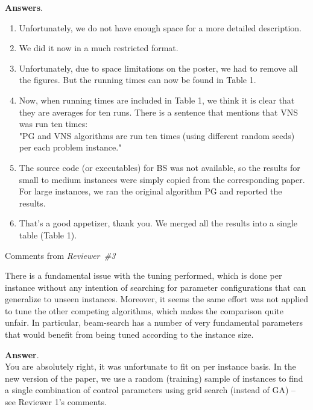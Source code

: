 \documentclass [11pt]{scrartcl}
\begin{document}
\textbf{Answers}. 
\begin{enumerate}
	
\item Unfortunately, we do not have enough space for a more detailed description.
\item We did it now in a much restricted format. 
\item Unfortunately, due to space limitations on the poster, we had to remove all the figures. But the running times can now be found in Table 1.
\item Now, when running times are included in Table 1, we think it is clear that they are averages for ten runs. There is a sentence that mentions that VNS was run ten times:\\ 
"PG and VNS algorithms are run ten times (using different random seeds) per each problem instance."
\item The source code (or executables) for BS was not available, so the results for small to medium instances were simply copied from the corresponding paper. For large instances, we ran the original algorithm PG and reported the results.
\item That's a good appetizer, thank you. We merged all the results into a single table (Table 1).
 
\end{enumerate}

\begin{center} Comments from \textit{Reviewer\ \#3}
	
\end{center}


\begin{leftbar}
There is a fundamental issue with the tuning performed, which is done per instance without any intention of searching for parameter configurations that can generalize to unseen instances. Moreover, it seems the same effort was not applied to tune the other competing algorithms, which makes the comparison quite unfair. In particular, beam-search has a number of very fundamental parameters that would benefit from being tuned according to the instance size.	
\end{leftbar}

\textbf{Answer}. \\
You are absolutely right, it was unfortunate to fit on per instance basis.
In the new version of the paper, we use a random (training) sample of instances to find a single combination of control parameters using grid search (instead of GA) -- see Reviewer 1's comments.
\end{document}
